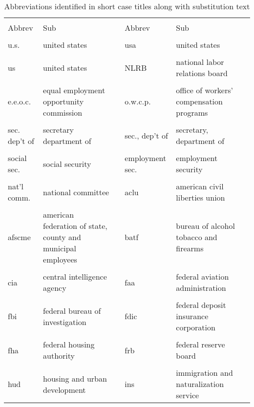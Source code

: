 \documentclass[10pt, letterpaper]{article}
\begin{document}
\begin{spacing}{1.0}
\begin{footnotesize}
\begin{longtable}[H]{p{1in}>{\raggedright}p{2in} p{0.2in} p{1in}>{\raggedright}p{2in} p{0in}}
    \caption{Abbreviations identified in short case titles along with substitution text}\\
    \hline\\[-6pt]
    Abbrev & Sub & & Abbrev & Sub & \\[2pt]
    \hline\\[-6pt]
    \endhead
    u.s. & united states & & usa  & united states &\\
    &  &  &  &  & \\[-6pt]
    us & united states & & NLRB & national labor relations board &\\
    &  &  &  &  & \\[-6pt]
    e.e.o.c. & equal employment opportunity commission & & o.w.c.p. & office of workers' compensation programs &\\
    &  &  &  &  & \\[-6pt]
    sec. dep't of & secretary department of & & sec., dep't of & secretary, department of &\\
    &  &  &  &  & \\[-6pt]
    social sec. & social security & & employment sec. & employment security &\\
    &  &  &  &  & \\[-6pt]
    nat'l comm. & national committee & & aclu & american civil liberties union &\\
    &  &  &  &  & \\[-6pt]
    afscme & american federation of state, county and municipal employees & & batf & bureau of alcohol tobacco and firearms &\\
    &  &  &  &  & \\[-6pt]
    cia & central intelligence agency & & faa & federal aviation administration &\\
    &  &  &  &  & \\[-6pt]
    fbi & federal bureau of investigation & & fdic & federal deposit insurance corporation &\\
    &  &  &  &  & \\[-6pt]
    fha & federal housing authority & & frb & federal reserve board &\\
    &  &  &  &  & \\[-6pt]
    hud & housing and urban development & & ins & immigration and naturalization service &\\

\end{longtable}
\end{footnotesize}
\end{spacing}
\end{document}
